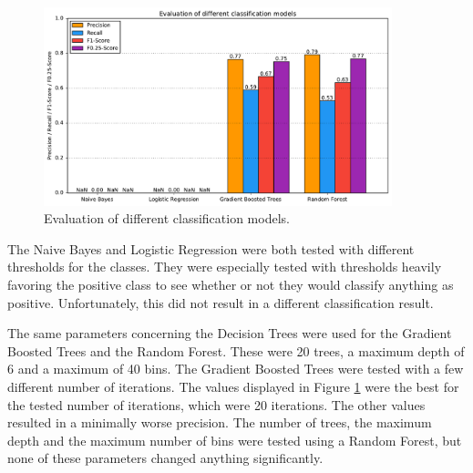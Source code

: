 \begin{figure}[H]
	\centering
	\includegraphics[width=0.9\textwidth]{img/classifier_eval}
	\caption{Evaluation of different classification models.}
	\label{classifier_eval}
\end{figure}
The Naive Bayes and Logistic Regression were both tested with different thresholds for the classes. They were especially tested with thresholds heavily favoring the positive class to see whether or not they would classify anything as positive. Unfortunately, this did not result in a different classification result.\par
The same parameters concerning the Decision Trees were used for the Gradient Boosted Trees and the Random Forest. These were 20 trees, a maximum depth of 6 and a maximum of 40 bins. The Gradient Boosted Trees were tested with a few different number of iterations. The values displayed in Figure \ref{classifier_eval} were the best for the tested number of iterations, which were 20 iterations. The other values resulted in a minimally worse precision. The number of trees, the maximum depth and the maximum number of bins were tested using a Random Forest, but none of these parameters changed anything significantly.\par

